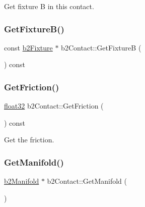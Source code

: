 Get fixture B in this contact. 

\mbox{\label{classb2_contact_aa89780a20a2b7cd424c09adca9917546}} 
\subsubsection{\texorpdfstring{GetFixtureB()}{GetFixtureB()}\hspace{0.1cm}{\footnotesize\ttfamily [2/2]}}
{\footnotesize\ttfamily const \mbox{\hyperlink{classb2_fixture}{b2\+Fixture}} $\ast$ b2\+Contact\+::\+Get\+FixtureB (\begin{DoxyParamCaption}{ }\end{DoxyParamCaption}) const\hspace{0.3cm}{\ttfamily [inline]}}

\mbox{\label{classb2_contact_a7650ec27931c82f3914f37fdeb267b02}} 
\subsubsection{\texorpdfstring{GetFriction()}{GetFriction()}}
{\footnotesize\ttfamily \mbox{\hyperlink{b2_settings_8h_aacdc525d6f7bddb3ae95d5c311bd06a1}{float32}} b2\+Contact\+::\+Get\+Friction (\begin{DoxyParamCaption}{ }\end{DoxyParamCaption}) const\hspace{0.3cm}{\ttfamily [inline]}}



Get the friction. 

\mbox{\label{classb2_contact_ab0597077b23615476327f9b32d9c4979}} 
\subsubsection{\texorpdfstring{GetManifold()}{GetManifold()}\hspace{0.1cm}{\footnotesize\ttfamily [1/2]}}
{\footnotesize\ttfamily \mbox{\hyperlink{structb2_manifold}{b2\+Manifold}} $\ast$ b2\+Contact\+::\+Get\+Manifold (\begin{DoxyParamCaption}{ }\end{DoxyParamCaption})\hspace{0.3cm}{\ttfamily [inline]}}

